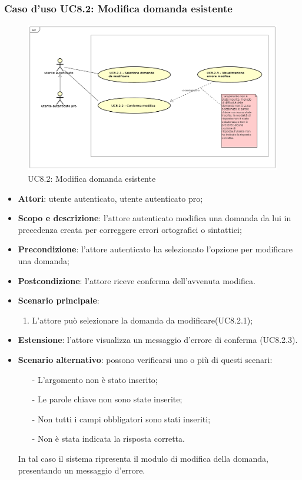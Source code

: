 	\subsubsection{Caso d'uso UC8.2: Modifica domanda esistente}
	\label{UC8.2}
	\begin{figure}[h]
		\centering
			\includegraphics[scale=0.45,keepaspectratio]{UML/UC8_2.png}
		\caption{UC8.2: Modifica domanda esistente}
	\end{figure}
	\FloatBarrier
	\begin{itemize}
		\item
			\textbf{Attori}: utente autenticato, utente autenticato pro;
		\item		
			\textbf{Scopo e descrizione}: l'attore autenticato modifica una domanda da lui in precedenza creata per correggere errori ortografici o sintattici;
		\item
			\textbf{Precondizione}: l'attore autenticato ha selezionato l'opzione per modificare una domanda;
		\item
			\textbf{Postcondizione}: l'attore riceve conferma dell'avvenuta modifica.
		\item
			\textbf{Scenario principale}:
				\begin{enumerate}
					\item
						L'attore può selezionare la domanda da modificare(UC8.2.1);
				\end{enumerate}
	       		
	 	\item
			\textbf{Estensione}: l'attore visualizza un messaggio d'errore di conferma (UC8.2.3).
	 	\item
	 		\textbf{Scenario alternativo}: possono verificarsi uno o più di questi scenari:
				\begin{itemize}
					\item[-] 	
						L'argomento non è stato inserito;
					\item[-] 
						Le parole chiave non sono state inserite;
					\item[-] 
						Non tutti i campi obbligatori sono stati inseriti; 
					\item[-]
						Non è stata indicata la risposta corretta.	
				\end{itemize}
			In tal caso il sistema ripresenta il modulo di modifica della domanda, presentando un messaggio d'errore.
	\end{itemize}
	
